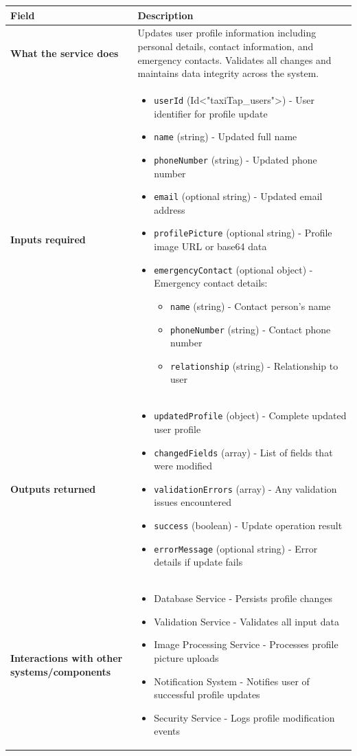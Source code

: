 \documentclass[11pt,a4paper]{article}
\begin{document}
\begin{longtable}{|p{3cm}|p{12cm}|}
\hline
\textbf{Field} & \textbf{Description} \\
\hline
\textbf{What the service does} & 
Updates user profile information including personal details, contact information, and emergency contacts. Validates all changes and maintains data integrity across the system. \\
\hline
\textbf{Inputs required} & 
\begin{itemize}[nosep]
\item \texttt{userId} (Id<"taxiTap\_users">) - User identifier for profile update
\item \texttt{name} (string) - Updated full name
\item \texttt{phoneNumber} (string) - Updated phone number
\item \texttt{email} (optional string) - Updated email address
\item \texttt{profilePicture} (optional string) - Profile image URL or base64 data
\item \texttt{emergencyContact} (optional object) - Emergency contact details:
  \begin{itemize}[nosep]
    \item \texttt{name} (string) - Contact person's name
    \item \texttt{phoneNumber} (string) - Contact phone number
    \item \texttt{relationship} (string) - Relationship to user
  \end{itemize}
\end{itemize} \\
\hline
\textbf{Outputs returned} & 
\begin{itemize}[nosep]
\item \texttt{updatedProfile} (object) - Complete updated user profile
\item \texttt{changedFields} (array) - List of fields that were modified
\item \texttt{validationErrors} (array) - Any validation issues encountered
\item \texttt{success} (boolean) - Update operation result
\item \texttt{errorMessage} (optional string) - Error details if update fails
\end{itemize} \\
\hline
\textbf{Interactions with other systems/components} & 
\begin{itemize}[nosep]
\item Database Service - Persists profile changes
\item Validation Service - Validates all input data
\item Image Processing Service - Processes profile picture uploads
\item Notification System - Notifies user of successful profile updates
\item Security Service - Logs profile modification events
\end{itemize} \\
\hline
\end{longtable}
\end{document}
